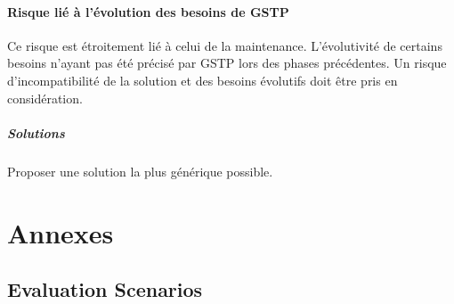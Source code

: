 \paragraph{Risque lié à l'évolution des besoins de GSTP\\}
Ce risque est étroitement lié à celui de la maintenance. L'évolutivité de certains besoins n'ayant pas été précisé par GSTP lors des phases précédentes. Un risque d'incompatibilité de la solution et des besoins évolutifs doit être pris en considération.

\subparagraph{Solutions\\}
Proposer une solution la plus générique possible. 

\section{Annexes}
    \subsection{Evaluation Scenarios}
        

